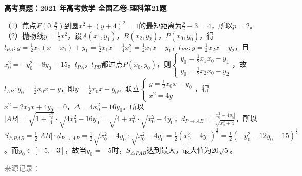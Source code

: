 \documentclass[UTF8,a4paper,11pt]{ctexart}
\newenvironment{gaokao}[1]{\par\medskip\noindent\textbf{高考真题：#1}\par\smallskip}{\par\medskip}
\begin{document}
\begin{gaokao}{2021 年高考数学 全国乙卷-理科第21题}
（1）焦点$F(0,\frac{p}{2})$到圆$x^2+(y+4)^2=1$的最短距离为$\frac{p}{2}+3=4$，所以$p=2$。
（2）抛物线$y=\frac14x^2$，设$A(x_1,y_1)$，$B(x_2,y_2)$，$P(x_0,y_0)$，得$l_{PA}: y=\frac12x_1(x-x_1)+y_1=\frac12x_1x-\frac14x_1^2=\frac12x_1x-y_1$，$l_{PB}: y=\frac12x_2x-y_2$，且$x_0^2=-y_0^2-8y_0-15$。$l_{PA}$，$l_{PB}$都过点$P(x_0,y_0)$，则$\begin{cases} y_0=\frac12x_1x_0-y_1 \\ y_0=\frac12x_2x_0-y_2 \end{cases}$，故$l_{AB}: y_0=\frac12x_0x-y$，即$y=\frac12x_0x-y_0$。联立$\begin{cases} y=\frac12x_0x-y_0 \\ x^2=4y \end{cases}$，得$x^2-2x_0x+4y_0=0$，$\Delta=4x_0^2-16y_0$。所以$|AB|=\sqrt{1+\frac{x_0^2}{4}}\cdot\sqrt{4x_0^2-16y_0}=\sqrt{4+x_0^2}\cdot\sqrt{x_0^2-4y_0}$，$d_{P\to AB}=\frac{|x_0^2-4y_0|}{\sqrt{x_0^2+4}}$，所以$S_{\triangle PAB}=\frac12|AB|\cdot d_{P\to AB}=\frac12\sqrt{x_0^2-4y_0}\cdot\sqrt{x_0^2-4y_0}=\frac12(x_0^2-4y_0)^{\frac32}=\frac12(-y_0^2-12y_0-15)^{\frac32}$。而$y_0\in[-5,-3]$，故当$y_0=-5$时，$S_{\triangle PAB}$达到最大，最大值为$20\sqrt{5}$。

\par\smallskip\textcolor{gray}{\footnotesize 来源记录：\texttt{}}

\end{gaokao}
\end{document}
